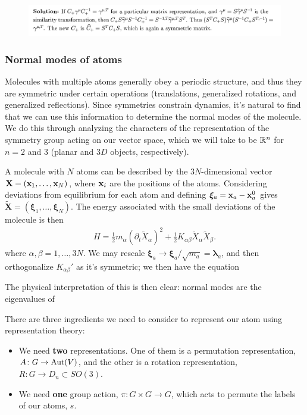 \documentclass[11pt]{article}
\begin{document}
\begin{figure}[H]
    \centering
    \includegraphics[width=\textwidth]{Figures/pvnsolution.png}
\end{figure}


\subsubsection{Normal modes of atoms}

Molecules with multiple atoms generally obey
a periodic structure, and thus they are symmetric
under certain operations (translations, generalized rotations, and
generalized reflections). Since symmetries constrain dynamics,
it's natural to find that we can use this information to determine
the normal modes of the molecule. We do this through
analyzing the characters of the representation of the symmetry
group acting on our vector space, which we will take to be $\mathbb{R}^n$
for $n = 2$ and $3$ (planar and $3D$ objects, respectively).

A molecule with $N$ atoms can be described by the $3N$-dimensional 
vector $\mathbf{X} = (\mathbf{x}_1, \ldots, \mathbf{x}_N)$, where $\mathbf{x}_i$ are
the positions of the atoms. Considering deviations from equilibrium for each atom
and defining $\boldsymbol{\xi}_a = \mathbf{x}_a - \mathbf{x}_a^0$
gives $\widetilde{\mathbf{X}} = (\boldsymbol{\xi}_1, \ldots, \boldsymbol{\xi}_N)$.
The energy associated with the small deviations of the molecule is
then
\begin{align*}
    H = \frac{1}{2}m_\alpha (\partial_t \widetilde{X}_\alpha)^2 + \frac{1}{2}K_{\alpha \beta} \widetilde{X}_\alpha \widetilde{X}_\beta.
\end{align*}
where $\alpha, \beta = 1, \ldots, 3N$. We may rescale 
$\boldsymbol{\xi}_a \to \boldsymbol{\xi}_a/\sqrt{m_a} = \boldsymbol{\lambda}_a$,
and then orthogonalize $K_{\alpha \beta}'$ as it's symmetric;
we then have the equation 

The physical interpretation of this is then clear: normal modes
are the eigenvalues of 

There are three ingredients we need to consider
to represent our atom using representation theory:
\begin{itemize}
    \item We need \textbf{two} representations. One of them
    is a permutation representation, $A \colon G \to \operatorname{Aut}(V)$,
    and the other is a rotation representation, $R \colon G \to D_n \subset SO(3)$.
    \item We need \textbf{one} group action, $\pi \colon G \times G \to G$,
    which acts to permute the labels of our atoms, $s$.
\end{itemize}
\end{document}
